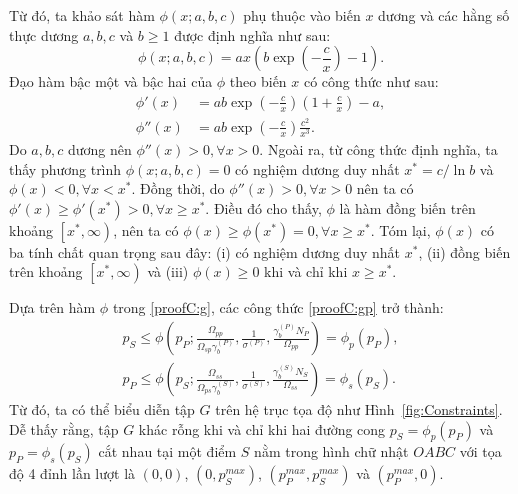 \documentclass[../main.tex]{subfiles}
\begin{document}
Từ đó, ta khảo sát hàm $\phi\left(x;a,b,c\right)$ phụ thuộc vào biến $x$ dương và các hằng số thực dương $a,b,c$ và $b \geq 1$ được định nghĩa như sau:
\begin{equation}\label{proofC:g}
    \phi\left(x;a,b,c\right) = ax\left(b\exp\left(-\frac{c}{x}\right)-1\right).
\end{equation}
Đạo hàm bậc một và bậc hai của $\phi$ theo biến $x$ có công thức như sau:
\begin{subequations}\label{proofC:dg}
\begin{align}
\phi'\left(x\right) &= ab\exp\left(-\frac{c}{x}\right)\left(1+\frac{c}{x}\right)-a, \\
\phi''\left(x\right) &= ab\exp\left(-\frac{c}{x}\right)\frac{c^2}{x^3}. 
\end{align}
\end{subequations}
Do $a,b,c$ dương nên $\phi''\left(x\right) > 0, \forall x > 0$. Ngoài ra, từ công thức định nghĩa, ta thấy phương trình $\phi\left(x;a,b,c\right) = 0$ có nghiệm dương duy nhất $x^* = c/\ln{b}$ và $\phi(x) < 0, \forall x<x^*$. Đồng thời, do $\phi''(x) > 0, \forall x > 0$ nên ta có $\phi'(x) \geq \phi'(x^*) > 0, \forall x \geq x^*$. Điều đó cho thấy, $\phi$ là hàm đồng biến trên khoảng $\left[x^*, \infty\right)$, nên ta có $\phi(x) \geq \phi(x^*) = 0, \forall x \geq x^*$.  Tóm lại, $\phi(x)$ có ba tính chất quan trọng sau đây: (i) có nghiệm dương duy nhất $x^*$, (ii) đồng biến trên khoảng  $\left[x^*,\infty\right)$ và (iii) $\phi(x) \geq 0$ khi và chỉ khi $x \geq x^*$.

Dựa trên hàm $\phi$ trong \eqref{proofC:g}, các công thức \eqref{proofC:gp} trở thành:
\begin{subequations}\label{proofC:gprw}
\begin{align}
p_S \leq \phi\left(p_P; \frac{\Omega_{pp}}{\Omega_{sp}\gamma_b^{(P)}}, \frac{1}{\sigma^{(P)}}, \frac{\gamma_b^{(P)}N_P}{\Omega_{pp}}\right) =  \phi_p\left(p_P\right), \\
p_P \leq \phi\left(p_S; \frac{\Omega_{ss}}{\Omega_{ps}\gamma_b^{(S)}}, \frac{1}{\sigma^{(S)}}, \frac{\gamma_b^{(S)}N_S}{\Omega_{ss}}\right) = \phi_s\left(p_S\right).
\end{align}
\end{subequations}
Từ đó, ta có thể biểu diễn tập $G$ trên hệ trục tọa độ như Hình~\ref{fig:Constraints}. Dễ thấy rằng, tập $G$ khác rỗng khi và chỉ khi hai đường cong $p_S = \phi_p\left(p_P\right)$ và $p_P = \phi_s\left(p_S\right)$ cắt nhau tại một điểm $S$ nằm trong hình chữ nhật $OABC$ với tọa độ 4 đỉnh lần lượt là $\left(0, 0\right)$, $\left(0, p_S^{max}\right)$, $\left(p_P^{max}, p_S^{max}\right)$ và $\left(p_P^{max}, 0\right)$. 
\end{document}
